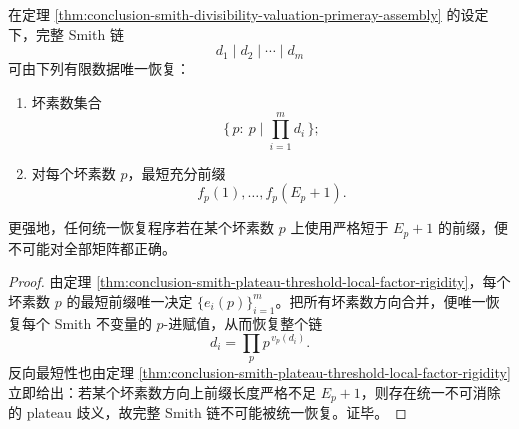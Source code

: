 \begin{corollary}\label{cor:conclusion-smith-finite-atomic-tomography}
在定理 \ref{thm:conclusion-smith-divisibility-valuation-primeray-assembly} 的设定下，完整 Smith 链
\[
d_1\mid d_2\mid\cdots\mid d_m
\]
可由下列有限数据唯一恢复：
\begin{enumerate}
  \item 坏素数集合
  \[
  \{\,p:\ p\mid \prod_{i=1}^{m}d_i\,\};
  \]
  \item 对每个坏素数 \(p\)，最短充分前缀
  \[
  f_p(1),\dots,f_p(E_p+1).
  \]
\end{enumerate}
更强地，任何统一恢复程序若在某个坏素数 \(p\) 上使用严格短于 \(E_p+1\) 的前缀，便不可能对全部矩阵都正确。
\end{corollary}
\begin{proof}
由定理 \ref{thm:conclusion-smith-plateau-threshold-local-factor-rigidity}，每个坏素数 \(p\) 的最短前缀唯一决定 \(\{e_i(p)\}_{i=1}^{m}\)。把所有坏素数方向合并，便唯一恢复每个 Smith 不变量的 \(p\)-进赋值，从而恢复整个链
\[
d_i=\prod_{p}p^{\,v_p(d_i)}.
\]
反向最短性也由定理 \ref{thm:conclusion-smith-plateau-threshold-local-factor-rigidity} 立即给出：若某个坏素数方向上前缀长度严格不足 \(E_p+1\)，则存在统一不可消除的 plateau 歧义，故完整 Smith 链不可能被统一恢复。证毕。
\end{proof}
